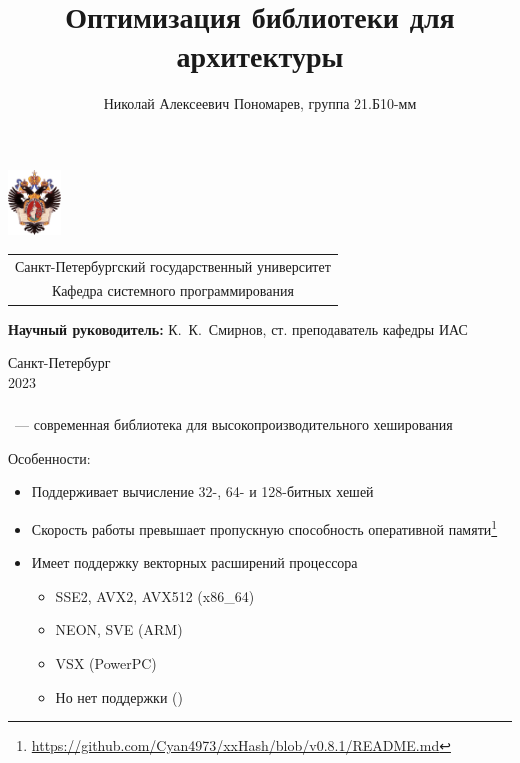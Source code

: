 \documentclass[aspectratio=169]{beamer}
\title[Оптимизация \xxHash{}]{Оптимизация библиотеки \xxHash{} для архитектуры \riscv{}}
\institute[СПбГУ]{}
\author[Николай Пономарев]{Николай Алексеевич Пономарев, группа 21.Б10-мм}
\begin{document}
{
\begin{frame}
	\includegraphics[width=1.4cm]{pictures/SPbGU_Logo.png}
	\vspace{-35pt}
	\hspace{-10pt}
	\begin{center}
		\begin{tabular}{c}
			\scriptsize{Санкт-Петербургский государственный университет} \\
			\scriptsize{Кафедра системного программирования}
		\end{tabular}
		\titlepage
	\end{center}

	\btVFill

	{\scriptsize
		\textbf{Научный руководитель:} К.~К.~Смирнов, ст. преподаватель кафедры ИАС \\
	}
	\begin{center}
		\vspace{5pt}
		\scriptsize{Санкт-Петербург\\
			2023}
	\end{center}

\end{frame}
}

\begin{frame}
	\frametitle{\xxHash{}}
	\xxHash{}~--- современная библиотека для высокопроизводительного хеширования

	Особенности:
	\begin{itemize}
		\item Поддерживает вычисление 32-, 64- и 128-битных хешей
		\item Скорость работы превышает пропускную способность оперативной памяти\footnote{\url{https://github.com/Cyan4973/xxHash/blob/v0.8.1/README.md}}
		\item Имеет поддержку векторных расширений процессора
		      \begin{itemize}
			      \item SSE2, AVX2, AVX512 (x86\_64)
			      \item NEON, SVE (ARM)
			      \item VSX (PowerPC)
			      \item Но нет поддержки \rvv{} (\riscv{})
		      \end{itemize}
	\end{itemize}
\end{frame}
\end{document}

